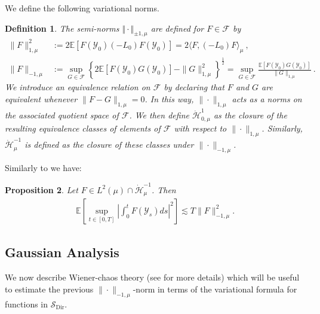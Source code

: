 \documentclass[a4paper, reqno, 12pt]{amsart}
\theoremstyle{plain}
\newtheorem{definition}{Definition}[section]
\newtheorem{prop}[definition]{Proposition}
\theoremstyle{definition}
\newcommand{\Sdir}{\mathcal{S}_{\text{Dir}}}
\begin{document}
We define the following variational norms.
\begin{definition} \label{def:probsobolev}
    The semi-norms $\Vert \cdot\Vert_{\pm 1, \mu}$ are defined for $F\in\mathcal F$ by
    \begin{align*}
        \|F\|^2_{1,\mu} &:= 2\mathbb E\left[F(\mathcal{Y}_0)(-L_0)F(\mathcal{Y}_0)\right] = 2\langle F,(-L_0)F\rangle_{\mu}\ , \\
        \|F\|_{-1,\mu} &:= \sup_{G\in \mathcal F} \left\{  2\mathbb E\left[ F(\mathcal{Y}_0)G(\mathcal{Y}_0)\right] -\|G\|^2_{1,\mu} \right\}^{\frac{1}{2}}  = \sup_{G\in \mathcal F} \frac{\mathbb E\left[F(\mathcal{Y}_0)G(\mathcal{Y}_0)\right]}{\|G\|_{1,\mu}}  \ .
    \end{align*}
We introduce an equivalence relation on $\mathcal F$ by declaring that $F$ and $G$ are equivalent whenever $\|F-G\|_{1,\mu}=0$. In this way, $\|\cdot\|_{1,\mu}$ acts as a norms on the associated quotient space  of $\mathcal F$. We then define $\dot{\mathcal H}^{1}_{0,\mu}$ as the closure of the resulting 
    equivalence classes of elements of $\mathcal F$ with respect to $\|\cdot\|_{1,\mu}$. Similarly, $\dot{\mathcal H}^{-1}_{\mu}$ is defined as the closure of these classes under  $\|\cdot\|_{-1,\mu}$.
\end{definition}
Similarly to \cite[Corollary 3.5]{GP18} we have:
\begin{prop}
\label{prop:KVineq}
Let $F\in L^2(\mu)\cap\dot{\mathcal{H}}^{-1}_{\mu}$. Then 
\begin{align*}
    \mathbb E\left[\sup_{t\in[0,T]} \left|\int_0^t F(\mathcal{Y}_s) ds\right|^2\right] \lesssim T\|F\|^2_{-1,\mu}.
\end{align*}
\end{prop}



\subsection{Gaussian Analysis} 
We now describe Wiener-chaos theory (see \cite[Chapter 1]{N06} for more details) which will be useful to estimate the previous $\|\cdot\|_{-1,\mu}$-norm in terms of the variational formula for functions in $\Sdir$.

\medskip
\end{document}

